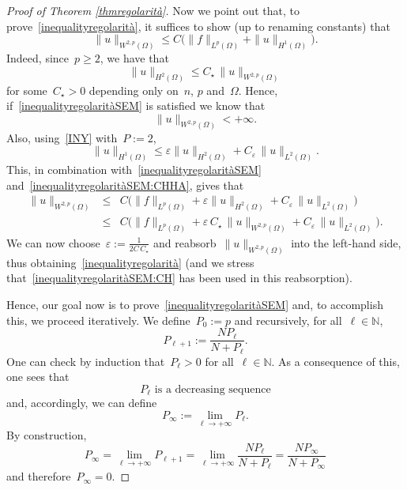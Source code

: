 \documentclass[12pt,a4paper,intlimits,sumlimits]{amsart}
\def \N {\mathbb{N}}
\theoremstyle{definition}
\theoremstyle{plain}
\numberwithin{equation}{section}
\newcommand{\e}{\varepsilon}
\renewcommand{\leq}{\leqslant}
\renewcommand{\le}{\leqslant}
\renewcommand{\ge}{\geqslant}
\begin{document}
\begin{proof}[Proof of Theorem \ref{thmregolarità}]
Now we point out that, 
to prove~\eqref{inequalityregolarità}, it suffices to show (up to renaming constants) that
\begin{equation}\label{inequalityregolaritàSEM}
\|u\|_{W^{2,p}(\Omega)}\leq 
C\Big(\|f\|_{L^p(\Omega)}+\|u\|_{H^1(\Omega)}\Big).
\end{equation}
Indeed, since~$p\ge2$, we have that
\begin{equation}\label{inequalityregolaritàSEM:CHHA}
\|u\|_{H^2(\Omega)}\le C_\star\,\|u\|_{W^{2,p}(\Omega)}\end{equation}
for some~$C_\star>0$ depending only on~$n$, $p$ and~$\Omega$.
Hence, if~\eqref{inequalityregolaritàSEM} is satisfied we know that
\begin{equation}\label{inequalityregolaritàSEM:CH}
\|u\|_{W^{2,p}(\Omega)}<+\infty.\end{equation}
Also, using~\eqref{INY} with~$P:=2$,
$$\|u\|_{H^1(\Omega)}\le \e\|u\|_{H^2(\Omega)}+C_\e\,\|u\|_{L^2(\Omega)}.$$
This, in combination with~\eqref{inequalityregolaritàSEM}
and~\eqref{inequalityregolaritàSEM:CHHA}, gives that
\begin{eqnarray*}
\|u\|_{W^{2,p}(\Omega)}&\leq &
C\Big(\|f\|_{L^p(\Omega)}+\e\|u\|_{H^2(\Omega)}+C_\e\,\|u\|_{L^2(\Omega)}\Big)\\&\le&
C\Big(\|f\|_{L^p(\Omega)}+\e \,C_\star \,\|u\|_{W^{2,p}(\Omega)}+C_\e\,\|u\|_{L^2(\Omega)}\Big).\end{eqnarray*}
We can now choose~$\e:=\frac{1}{2C \,C_\star}$ and reabsorb~$\|u\|_{W^{2,p}(\Omega)}$
into the left-hand side, thus obtaining~\eqref{inequalityregolarità}
(and we stress that~\eqref{inequalityregolaritàSEM:CH} has been used in this reabsorption).\bigskip

Hence, our goal now is to prove~\eqref{inequalityregolaritàSEM}
and, to accomplish this,
we proceed iteratively. 
We define~$P_0:=p$ and recursively, for all~$\ell\in\N$,
\begin{equation}\label{a2lbeee23kepndlerv}
P_{\ell+1}:=\frac{N P_\ell}{N+P_\ell}.\end{equation}
One can check by induction that~$P_\ell>0$ for all~$\ell\in\N$.
As a consequence of this, one sees that
\begin{equation}\label{PA:SLPKowerf}
{\mbox{$P_\ell$ is a decreasing sequence}}\end{equation}
and, accordingly, we can define
$$ P_\infty:=\lim_{\ell\to+\infty}P_\ell.$$
By construction,
$$ P_\infty=\lim_{\ell\to+\infty}P_{\ell+1}=\lim_{\ell\to+\infty}
\frac{N P_\ell}{N+P_\ell}=\frac{N P_\infty}{N+P_\infty}$$
and therefore~$P_\infty=0$.


\end{proof}
\end{document}
